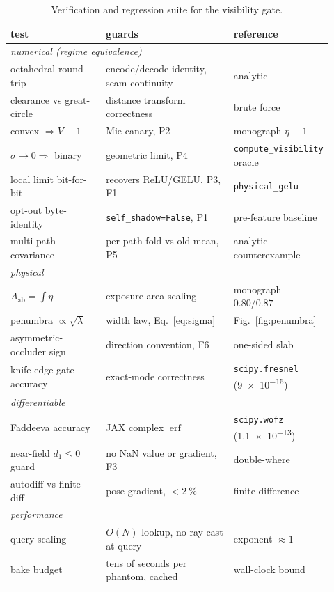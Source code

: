 \documentclass[11pt]{article}
\newcommand{\erf}{\ensuremath{\operatorname{erf}}}
\begin{document}
\begin{table}[t]
  \centering
  \caption{Verification and regression suite for the visibility gate.}
  \label{tab:tests}
  \small
  \begin{tabular}{p{0.30\linewidth}p{0.40\linewidth}p{0.22\linewidth}}
    \toprule
    test & guards & reference \\
    \midrule
    \multicolumn{3}{l}{\emph{numerical (regime equivalence)}}\\
    octahedral round-trip & encode/decode identity, seam continuity & analytic \\
    clearance vs great-circle & distance transform correctness & brute force \\
    convex $\Rightarrow V\equiv1$ & Mie canary, P2 & monograph $\eta\equiv1$ \\
    $\sigma\to0\Rightarrow$ binary & geometric limit, P4 & \texttt{compute\_visibility} oracle \\
    local limit bit-for-bit & recovers ReLU/GELU, P3, F1 & \texttt{physical\_gelu} \\
    opt-out byte-identity & \texttt{self\_shadow=False}, P1 & pre-feature baseline \\
    multi-path covariance & per-path fold vs old mean, P5 & analytic counterexample \\
    \midrule
    \multicolumn{3}{l}{\emph{physical}}\\
    $A_{\mathrm{ab}}=\int\eta$ & exposure-area scaling & monograph $0.80/0.87$ \\
    penumbra $\propto\sqrt\lambda$ & width law, Eq.~\eqref{eq:sigma} & Fig.~\ref{fig:penumbra} \\
    asymmetric-occluder sign & direction convention, F6 & one-sided slab \\
    knife-edge gate accuracy & exact-mode correctness & \texttt{scipy.fresnel} (\num{9e-15}) \\
    \midrule
    \multicolumn{3}{l}{\emph{differentiable}}\\
    Faddeeva accuracy & JAX complex \erf{} & \texttt{scipy.wofz} (\num{1.1e-13}) \\
    near-field $d_1\le0$ guard & no NaN value or gradient, F3 & double-where \\
    autodiff vs finite-diff & pose gradient, $<\SI{2}{\percent}$ & finite difference \\
    \midrule
    \multicolumn{3}{l}{\emph{performance}}\\
    query scaling & $O(N)$ lookup, no ray cast at query & exponent $\approx1$ \\
    bake budget & tens of seconds per phantom, cached & wall-clock bound \\
    \bottomrule
  \end{tabular}
\end{table}
\end{document}
